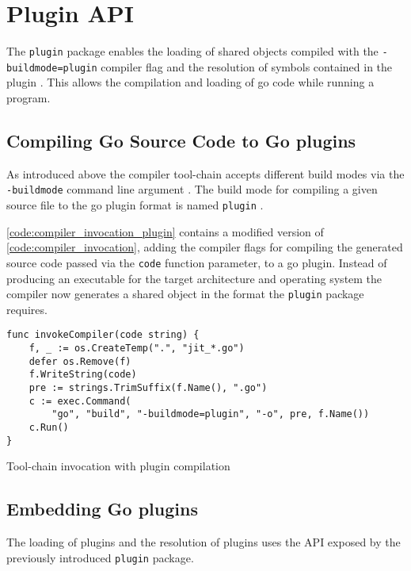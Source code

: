 \chapter{Plugin API}

The \texttt{plugin} package enables the loading of shared objects compiled with
the \newline \texttt{-buildmode=plugin} compiler flag and the resolution of
symbols contained in the plugin \cite[Overview]{go_plugin}. This allows the
compilation and loading of go code while running a program.

\section{Compiling Go Source Code to Go plugins}

As introduced above the compiler tool-chain accepts different build modes via
the \texttt{-buildmode} command line argument \cite{go_build_mode}. The build
mode for compiling a given source file to the go plugin format is named
\texttt{plugin} \cite{go_build_mode} \cite[Overview]{go_plugin}.

\autoref{code:compiler_invocation_plugin} contains a modified version of
\autoref{code:compiler_invocation}, adding the compiler flags for compiling the
generated source code passed via the \texttt{code} function parameter, to a go
plugin. Instead of producing an executable for the target architecture and
operating system the compiler now generates a shared object in the format the
\texttt{plugin} package requires.

\begin{listing}[H]
    \begin{verbatim}
func invokeCompiler(code string) {
    f, _ := os.CreateTemp(".", "jit_*.go")
    defer os.Remove(f)
    f.WriteString(code)
    pre := strings.TrimSuffix(f.Name(), ".go")
    c := exec.Command(
        "go", "build", "-buildmode=plugin", "-o", pre, f.Name())
    c.Run()
}
    \end{verbatim}
    \caption{Tool-chain invocation with plugin compilation}
    \label{code:compiler_invocation_plugin}
\end{listing}

\section{Embedding Go plugins}

The loading of plugins and the resolution of plugins uses the API exposed by
the previously introduced \texttt{plugin} package.

